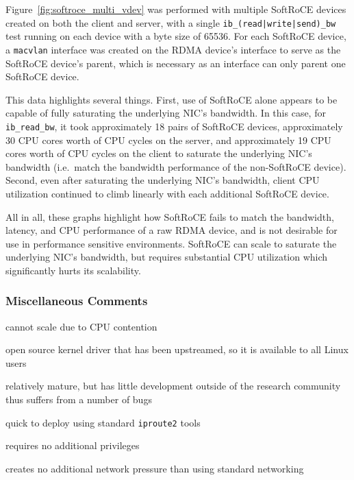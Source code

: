 \documentclass[12pt,titlepage]{article}
\begin{document}
Figure~\ref{fig:softroce_multi_vdev} was performed with multiple SoftRoCE devices created on both the client and server, with a single \texttt{ib\_(read|write|send)\_bw} test running on each device with a byte size of 65536.
For each SoftRoCE device, a \texttt{macvlan} interface was created on the RDMA device's interface to serve as the SoftRoCE device's parent, which is necessary as an interface can only parent one SoftRoCE device.

This data highlights several things.
First, use of SoftRoCE alone appears to be capable of fully saturating the underlying NIC's bandwidth.
In this case, for \texttt{ib\_read\_bw}, it took approximately 18 pairs of SoftRoCE devices, approximately 30 CPU cores worth of CPU cycles on the server, and approximately 19 CPU cores worth of CPU cycles on the client to saturate the underlying NIC's bandwidth (i.e.\ match the bandwidth performance of the non-SoftRoCE device).
Second, even after saturating the underlying NIC's bandwidth, client CPU utilization continued to climb linearly with each additional SoftRoCE device.

All in all, these graphs highlight how SoftRoCE fails to match the bandwidth, latency, and CPU performance of a raw RDMA device, and is not desirable for use in performance sensitive environments.
SoftRoCE can scale to saturate the underlying NIC's bandwidth, but requires substantial CPU utilization which significantly hurts its scalability.

\subsubsection*{Miscellaneous Comments}
\begin{description}[nolistsep,font={{\scshape\bfseries}}]
	\item[Scalability Limits] cannot scale due to CPU contention
	\item[Proprietary] open source kernel driver that has been upstreamed, so it is available to all Linux users
	\item[Maturity] relatively mature, but has little development outside of the research community thus suffers from a number of bugs~\cite{softrocedriver}
	\item[Ease in Deployment] quick to deploy using standard \texttt{iproute2} tools
	\item[Execution Privileges] requires no additional privileges
	\item[Network Pressure] creates no additional network pressure than using standard networking
\end{description}
\end{document}
